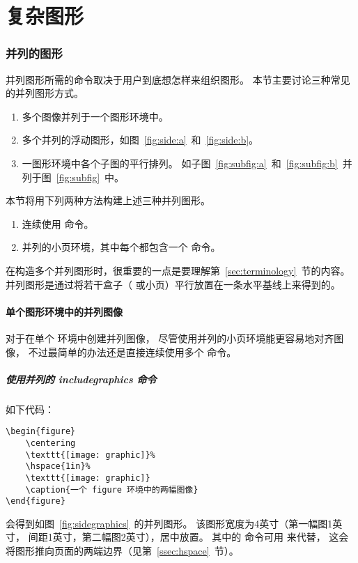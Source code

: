 \part{复杂图形}

\section{并列的图形}\label{sec:sidebyside}

并列图形所需的命令取决于用户到底想怎样来组织图形。
本节主要讨论三种常见的并列图形方式。
\begin{enumerate}
	\item 多个图像并列于一个图形环境中。
	\item 多个并列的浮动图形，如图~\ref{fig:side:a}~和~\ref{fig:side:b}。
	\item 一图形环境中各个子图的平行排列。
	如子图~\ref{fig:subfig:a}~和~\ref{fig:subfig:b}~并列于图~\ref{fig:subfig}~中。
\end{enumerate}

本节将用下列两种方法构建上述三种并列图形。
\begin{enumerate}
	\item 连续使用  命令。
	\item 并列的小页环境，其中每个都包含一个  命令。
\end{enumerate}
在构造多个并列图形时，很重要的一点是要理解第~\ref{sec:terminology}~节的内容。
并列图形是通过将若干盒子（ 或小页）平行放置在一条水平基线上来得到的。

\subsection{单个图形环境中的并列图像}\label{ssec:sidegraphics-singlefig}

对于在单个  环境中创建并列图像，
尽管使用并列的小页环境能更容易地对齐图像，
不过最简单的办法还是直接连续使用多个  命令。

\subsubsection{使用并列的 includegraphics 命令}

如下代码：
\begin{lstlisting}
\begin{figure} 
	\centering 
	\texttt{[image: graphic]}% 
	\hspace{1in}% 
	\texttt{[image: graphic]} 
	\caption{一个 figure 环境中的两幅图像} 
\end{figure}
\end{lstlisting}
会得到如图~\ref{fig:sidegraphics}~的并列图形。
该图形宽度为4英寸（第一幅图1英寸， 间距1英寸，第二幅图2英寸），居中放置。
其中的  命令可用  来代替，
这会将图形推向页面的两端边界（见第~\ref{ssec:hspace}~节）。

